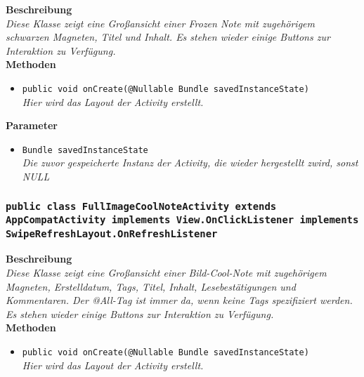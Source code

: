                	\textbf{Beschreibung} \\
      	        \textit{Diese Klasse zeigt eine Großansicht einer Frozen Note mit zugehörigem schwarzen Magneten, Titel und Inhalt. Es stehen wieder einige Buttons zur Interaktion zu Verfügung.} \\
                
                \textbf{Methoden}
                \begin{itemize}
        		\item\texttt{{public void onCreate(@Nullable Bundle savedInstanceState)}}\\
                \textit{Hier wird das Layout der Activity erstellt.}\\
                \end{itemize}
                
                \textbf{Parameter}
                \begin{itemize}
        		\item\texttt{Bundle savedInstanceState}\\ 
                \textit{Die zuvor gespeicherte Instanz der Activity, die wieder hergestellt zwird, sonst NULL}\\
                \end{itemize} 
        
        \subsubsection{\texttt{public class FullImageCoolNoteActivity extends AppCompatActivity implements View.OnClickListener implements SwipeRefreshLayout.OnRefreshListener}}
               
               	\textbf{Beschreibung} \\
      	        \textit{Diese Klasse zeigt eine Großansicht einer Bild-Cool-Note mit zugehörigem Magneten, Erstelldatum, Tags, Titel, Inhalt, Lesebestätigungen und Kommentaren. Der @All-Tag ist immer da, wenn keine Tags spezifiziert werden. Es stehen wieder einige Buttons zur Interaktion zu Verfügung.} \\
                
                \textbf{Methoden}
                \begin{itemize}
        		\item\texttt{{public void onCreate(@Nullable Bundle savedInstanceState)}}\\
                \textit{Hier wird das Layout der Activity erstellt.}\\
                \end{itemize}
                
